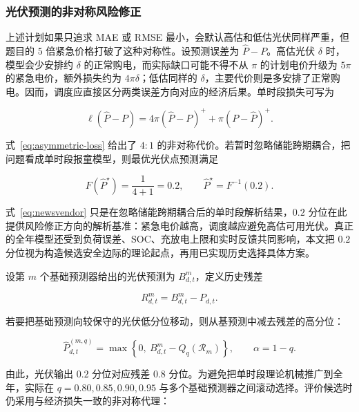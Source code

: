 \subsubsection{光伏预测的非对称风险修正}

上述计划如果只追求 MAE 或 RMSE 最小，会默认高估和低估光伏同样严重，但题目的 $5$ 倍紧急价格打破了这种对称性。设预测误差为 $\hat P-P$。高估光伏 $\delta$ 时，模型会少安排约 $\delta$ 的正常购电，而实际缺口可能不得不从 $\pi$ 的计划电价升级为 $5\pi$ 的紧急电价，额外损失约为 $4\pi\delta$；低估同样的 $\delta$，主要代价则是多安排了正常购电。因而，调度应直接区分两类误差方向对应的经济后果。单时段损失可写为

\begin{equation}
    \ell(\hat P-P)=4\pi(\hat P-P)^++\pi(P-\hat P)^+ .
    \label{eq:asymmetric-loss}
\end{equation}

式~\eqref{eq:asymmetric-loss} 给出了 $4{:}1$ 的非对称代价。若暂时忽略储能跨期耦合，把问题看成单时段报童模型，则最优光伏点预测满足 \cite{qin2011newsvendor,polat2024renewable}

\begin{equation}
    F(\hat P^\star)=\frac{1}{4+1}=0.2,
    \qquad \hat P^\star=F^{-1}(0.2).
    \label{eq:newsvendor}
\end{equation}

式~\eqref{eq:newsvendor} 只是在忽略储能跨期耦合后的单时段解析结果，$0.2$ 分位在此提供风险修正方向的解析基准：紧急电价越高，调度越应避免高估可用光伏。真正的全年模型还受到负荷误差、SOC、充放电上限和实时反馈共同影响，本文把 $0.2$ 分位视为构造候选安全边际的理论起点，再用已实现历史选择具体方案。

设第 $m$ 个基础预测器给出的光伏预测为 $B^m_{d,t}$，定义历史残差

\begin{equation}
    R^m_{d,t}=B^m_{d,t}-P_{d,t}.
    \label{eq:pv-residual}
\end{equation}

若要把基础预测向较保守的光伏低分位移动，则从基预测中减去残差的高分位：

\begin{equation}
    \hat P^{(m,q)}_{d,t}=\max\left\{0,\ B^m_{d,t}-Q_q(\mathcal R_m)\right\},
    \qquad \alpha=1-q.
    \label{eq:pv-forecast}
\end{equation}

由此，光伏输出 $0.2$ 分位对应残差 $0.8$ 分位。为避免把单时段理论机械推广到全年，实际在 $q=0.80,0.85,0.90,0.95$ 与多个基础预测器之间滚动选择。评价候选时仍采用与经济损失一致的非对称代理：

